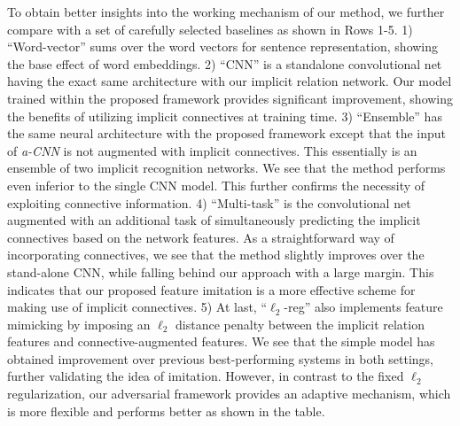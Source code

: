 \documentclass[11pt,a4paper]{article}
\begin{document}
To obtain better insights into the working mechanism of our method, we further compare with a set of carefully selected baselines as shown in Rows 1-5. 1) ``Word-vector'' sums over the word vectors for sentence representation, showing the base effect of word embeddings. 2) ``CNN'' is a standalone convolutional net having the exact same architecture with our implicit relation network. Our model trained within the proposed framework provides significant improvement, showing the benefits of utilizing implicit connectives at training time. 3) ``Ensemble'' has the same neural architecture with the proposed framework except that the input of {\it a-CNN} is not augmented with implicit connectives. This essentially is an ensemble of two implicit recognition networks. We see that the method performs even inferior to the single CNN model. This further confirms the necessity of exploiting connective information.  4) ``Multi-task'' is the convolutional net augmented with an additional task of simultaneously predicting the implicit connectives based on the network features. As a straightforward way of incorporating connectives, we see that the method slightly improves over the stand-alone CNN, while falling behind our approach with a large margin. This indicates that our proposed feature imitation is a more effective scheme for making use of implicit connectives. 5) At last, ``$\ell_2$-reg'' also implements feature mimicking by imposing an $\ell_2$ distance penalty between the implicit relation features and connective-augmented features. We see that the simple model has obtained improvement over previous best-performing systems in both settings, further validating the idea of imitation. However, in contrast to the fixed $\ell_2$ regularization, our adversarial framework provides an adaptive mechanism, which is more flexible and performs better as shown in the table.
\end{document}

